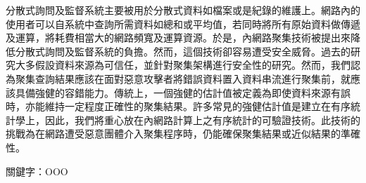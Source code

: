 
分散式詢問及監督系統主要被用於分散式資料如檔案或是紀錄的維護上。網路內的使用者可以自系統中查詢所需資料如總和或平均值，若同時將所有原始資料做傳遞及運算，將耗費相當大的網路頻寬及運算資源。於是，內網路聚集技術被提出來降低分散式詢問及監督系統的負擔。然而，這個技術卻容易遭受安全威脅。過去的研究大多假設資料來源為可信任，並針對聚集架構進行安全性的研究。然而，我們認為聚集查詢結果應該在面對惡意攻擊者將錯誤資料置入資料串流進行聚集前，就應該具備強健的容錯能力。傳統上，一個強健的估計值被定義為即使資料來源有誤時，亦能維持一定程度正確性的聚集結果。許多常見的強健估計值是建立在有序統計學上，因此，我們將重心放在內網路計算上之有序統計的可驗證技術。此技術的挑戰為在網路遭受惡意團體介入聚集程序時，仍能確保聚集結果或近似結果的準確性。
	
\vspace{1em}
\vspace{1em}
\vspace{1em}
\noindent 關鍵字：OOO